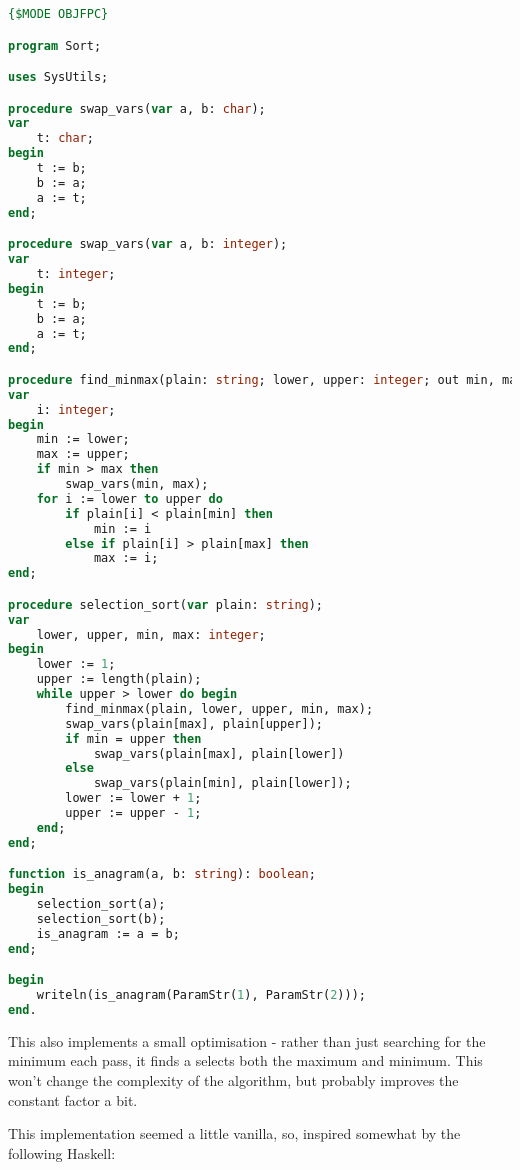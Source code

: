 \documentclass[fleqn,a4paper,11pt]{article}
\begin{document}
\begin{lstlisting}[language=Pascal, caption=Initial selection sort]
{$MODE OBJFPC}

program Sort;

uses SysUtils;

procedure swap_vars(var a, b: char);
var
    t: char;
begin
    t := b;
    b := a;
    a := t;
end;

procedure swap_vars(var a, b: integer);
var
    t: integer;
begin
    t := b;
    b := a;
    a := t;
end;

procedure find_minmax(plain: string; lower, upper: integer; out min, max: integer);
var
    i: integer;
begin
    min := lower;
    max := upper;
    if min > max then
        swap_vars(min, max);
    for i := lower to upper do
        if plain[i] < plain[min] then
            min := i
        else if plain[i] > plain[max] then
            max := i;
end;

procedure selection_sort(var plain: string);
var
    lower, upper, min, max: integer;
begin
    lower := 1;
    upper := length(plain);
    while upper > lower do begin
        find_minmax(plain, lower, upper, min, max);
        swap_vars(plain[max], plain[upper]);
        if min = upper then
            swap_vars(plain[max], plain[lower])
        else
            swap_vars(plain[min], plain[lower]);
        lower := lower + 1;
        upper := upper - 1;
    end;
end;

function is_anagram(a, b: string): boolean;
begin
    selection_sort(a);
    selection_sort(b);
    is_anagram := a = b;
end;

begin
    writeln(is_anagram(ParamStr(1), ParamStr(2)));
end.
\end{lstlisting}
\iffalse $ \fi %

    This also implements a small optimisation - rather than just searching for
    the minimum each pass, it finds a selects both the maximum and minimum. This
    won't change the complexity of the algorithm, but probably improves the
    constant factor a bit.

    This implementation seemed a little vanilla, so, inspired somewhat by the
    following Haskell:
\end{document}
